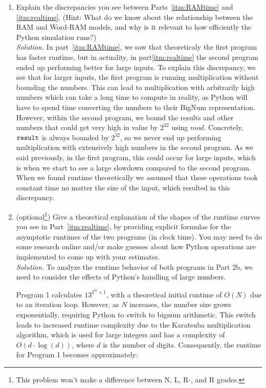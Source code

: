 \documentclass[11pt]{article}
\begin{document}
\begin{enumerate}
\begin{enumerate}
    \item Explain the discrepancies you see between Parts~\ref{itm:RAMtime} and \ref{itm:realtime}.  (Hint: What do we know about the relationship between the RAM and Word-RAM models, and why is it relevant to how efficiently the Python simulation runs?) \\
    \textit{Solution.} In part~\ref{itm:RAMtime}, we saw that theoreticaly the first program has faster runtime, but in actuality, in part\ref{itm:realtime} the second program ended up performing better for large inputs. To explain this discrepancy, we see that for larger inputs, the first program is running multiplication without bounding the numbers. This can lead to multiplication with arbitrarily high numbers which can take a long time to compute in reality, as Python will have to spend time converting the numbers to their BigNum representation. However, within the second program, we bound the results and other numbers that could get very high in value by $2^{32}$ using $mod$. Concretely, $\texttt{result}$ is always bounded by $2^{32}$, so we never end up performing multiplication with extensively high numbers in the second program. As we said previously, in the first program, this could occur for large inputs, which is when we start to see a large slowdown compared to the second program. When we found runtime theoretically we assumed that these operations took constant time no matter the size of the input, which resulted in this discrepancy.
    
    \item (optional\footnote{This problem won't make a difference between N, L, R-, and R grades.}) Give a theoretical explanation of the shapes of the runtime curves you see in Part~\ref{itm:realtime}, by providing explicit formulas for the asymptotic runtimes of the two programs (in clock time). You may need to do some research online and/or make guesses about how Python operations are implemented to come up with your estimates. \\
    \textit{Solution.} To analyze the runtime behavior of both programs in Part 2b, we need to consider the effects of Python's handling of large numbers.

    Program 1 calculates $13^{2^N + 1}$, with a theoretical initial runtime of $O(N)$ due to an iteration loop. However, as $N$ increases, the number size grows exponentially, requiring Python to switch to bignum arithmetic. This switch leads to increased runtime complexity due to the Karatsuba multiplication algorithm, which is used for large integers and has a complexity of $O(d \cdot \log(d))$, where $d$ is the number of digits. Consequently, the runtime for Program 1 becomes approximately:
    

\end{enumerate}
\end{enumerate}
\end{document}
